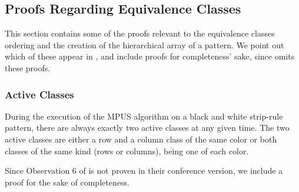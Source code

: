 \subsection{Proofs Regarding Equivalence Classes}
\label{ss_classes}

This section contains some of the proofs relevant 
to the equivalence classes ordering and the creation of the 
hierarchical array of a pattern.
We point out which of these appear in \cite{ACJKLW07}, and include proofs
for completeness' sake, since \cite{ACJKLW07} omits these proofs.

\subsubsection{Active Classes}


\begin{proposition}
\label{t_active_classes}
During the execution of the MPUS algorithm on a black and white strip-rule pattern, there are always exactly two active classes at any given time.
The two active classes are either a row and a column
class of the same color or both classes of the same kind (rows or columns),
 being one of each color. 
\end{proposition}
Since Observation 6 of \cite{ACJKLW07} is not proven in their conference
version, we include a proof for the sake of completeness.

